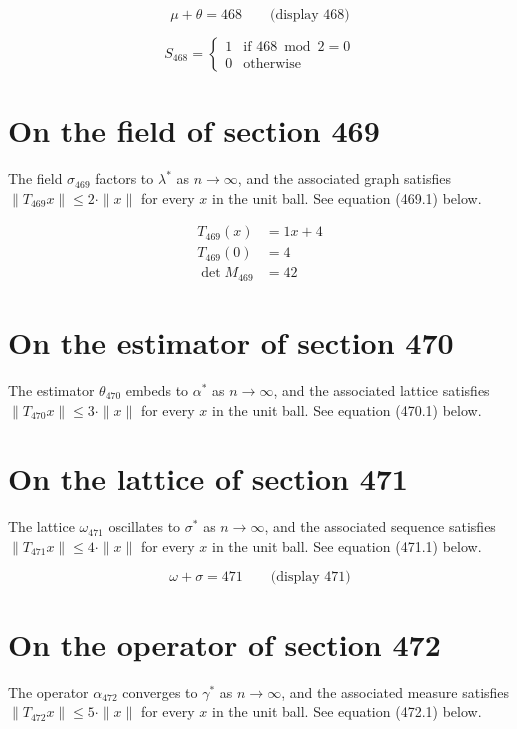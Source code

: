 \documentclass{article}
\begin{document}
$$
\mu + \theta = 468 \qquad \text{(display 468)}
$$

\begin{equation}
S_{468} = \begin{cases} 1 & \text{if } 468 \bmod 2 = 0 \\ 0 & \text{otherwise} \end{cases}
\end{equation}

\section{On the field of section 469}
The field $\sigma_{469}$ factors to $\lambda^{*}$ as $n \to \infty$,
and the associated graph satisfies $\|T_{469} x\| \leq 2 \cdot \|x\|$
for every $x$ in the unit ball. See equation (469.1) below.

\begin{align}
T_{469}(x) &= 1 x + 4 \\
T_{469}(0) &= 4 \\
\det M_{469} &= 42
\end{align}

\section{On the estimator of section 470}
The estimator $\theta_{470}$ embeds to $\alpha^{*}$ as $n \to \infty$,
and the associated lattice satisfies $\|T_{470} x\| \leq 3 \cdot \|x\|$
for every $x$ in the unit ball. See equation (470.1) below.

\section{On the lattice of section 471}
The lattice $\omega_{471}$ oscillates to $\sigma^{*}$ as $n \to \infty$,
and the associated sequence satisfies $\|T_{471} x\| \leq 4 \cdot \|x\|$
for every $x$ in the unit ball. See equation (471.1) below.

$$
\omega + \sigma = 471 \qquad \text{(display 471)}
$$

\section{On the operator of section 472}
The operator $\alpha_{472}$ converges to $\gamma^{*}$ as $n \to \infty$,
and the associated measure satisfies $\|T_{472} x\| \leq 5 \cdot \|x\|$
for every $x$ in the unit ball. See equation (472.1) below.
\end{document}
